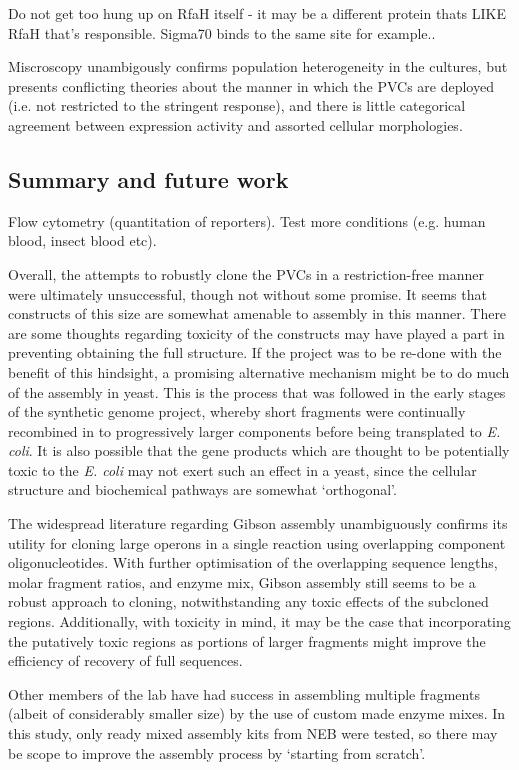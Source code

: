 Do not get too hung up on RfaH itself - it may be a different protein thats LIKE RfaH that's responsible. Sigma70 binds to the same site for example..\citep{Sevostyanova2008}



Miscroscopy unambigously confirms population heterogeneity in the cultures, but presents conflicting theories about the manner in which the PVCs are deployed (i.e. not restricted to the stringent response), and there is little categorical agreement between expression activity and assorted cellular morphologies.


\subsection{Summary and future work}
Flow cytometry (quantitation of reporters). Test more conditions (e.g. human blood, insect blood etc).

Overall, the attempts to robustly clone the PVCs in a restriction-free manner were ultimately unsuccessful, though not without some promise. It seems that constructs of this size are somewhat amenable to assembly in this manner. There are some thoughts regarding toxicity of the constructs may have played a part in preventing obtaining the full structure. If the project was to be re-done with the benefit of this hindsight, a promising alternative mechanism might be to do much of the assembly in yeast. This is the process that was followed in the early stages of the synthetic genome project, whereby short fragments were continually recombined in to progressively larger components before being transplated to \emph{E. coli}. It is also possible that the gene products which are thought to be potentially toxic to the \emph{E. coli} may not exert such an effect in a yeast, since the cellular structure and biochemical pathways are somewhat `orthogonal'.

The widespread literature regarding Gibson assembly unambiguously confirms its utility for cloning large operons in a single reaction using overlapping component oligonucleotides. With further optimisation of the overlapping sequence lengths, molar fragment ratios, and enzyme mix, Gibson assembly still seems to be a robust approach to cloning, notwithstanding any toxic effects of the subcloned regions. Additionally, with toxicity in mind, it may be the case that incorporating the putatively toxic regions as portions of larger fragments might improve the efficiency of recovery of full sequences.

Other members of the lab have had success in assembling multiple fragments (albeit of considerably smaller size) by the use of custom made enzyme mixes. In this study, only ready mixed assembly kits from NEB were tested, so there may be scope to improve the assembly process by `starting from scratch'.

